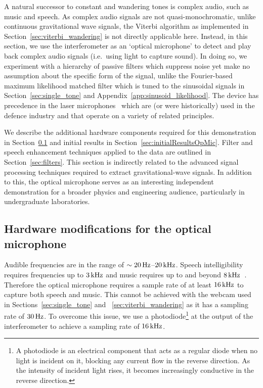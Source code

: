 \documentclass[paper-main.tex]{subfiles}
\begin{document}
A natural successor to constant and wandering tones is complex audio, such as music and speech. As complex audio signals are not quasi-monochromatic, unlike continuous gravitational wave signals, the Viterbi algorithm as implemented in Section~\ref{sec:viterbi_wandering} is not directly applicable here. Instead, in this section, we use the interferometer as an `optical microphone' to detect and play back complex audio signals (i.e.\ using light to capture sound).
In doing so, we experiment with a hierarchy of passive filters which suppress noise yet make no assumption about the specific form of the signal, unlike the Fourier-based maximum likelihood matched filter which is tuned to the sinusoidal signals in Section~\ref{sec:single_tone} and Appendix~\ref{app:sinusoid_likelihood}.
The device has precedence in the laser microphones~\cite{laser_microphone} which are (or were historically) used in the defence industry and that operate on a variety of related principles.


We describe the additional hardware components required for this demonstration in Section~\ref{sec:photodiode} and initial results in Section~\ref{sec:initialResultsOpMic}. Filter and speech enhancement techniques applied to the data are outlined in Section~\ref{sec:filters}.
This section is indirectly related to the advanced signal processing techniques required to extract gravitational-wave signals.
In addition to this, the optical microphone serves as an interesting independent demonstration for a broader physics and engineering audience, particularly in undergraduate laboratories.



\subsection{Hardware modifications for the optical microphone}
\label{sec:photodiode}


Audible frequencies are in the range of $\sim 20\,{\rm Hz}$--$20\,{\rm kHz}$. Speech intelligibility requires frequencies up to $3\,{\rm kHz}$ and music requires up to and beyond $8\,{\rm kHz}$~\cite{speech_intelligibility}. Therefore the optical microphone requires a sample rate of at least $16\,{\rm kHz}$ to capture both speech and music. This cannot be achieved with the webcam used in Sections~\ref{sec:single_tone} and ~\ref{sec:viterbi_wandering} as it has a sampling rate of $30\,{\rm Hz}$.
To overcome this issue, we use a photodiode\footnote{A photodiode is an electrical component that acts as a regular diode when no light is incident on it, blocking any current flow in the reverse direction. As the intensity of incident light rises, it becomes increasingly conductive in the reverse direction.} at the output of the interferometer to achieve a sampling rate of $16\,{\rm kHz}$.
\end{document}
